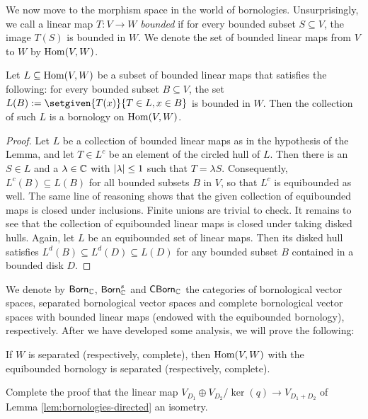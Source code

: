We now move to the morphism space in the world of bornologies. Unsurprisingly, we call a linear map \(T \colon V \to W\) \textit{bounded} if for every bounded subset \(S \subseteq V\), the image \(T(S)\) is bounded in \(W\). We denote the set of bounded linear maps from \(V\) to \(W\) by \(\operatorname{Hom}(V,W)\). 

\begin{lemma}
    Let \(L \subseteq \operatorname{Hom}(V,W)\) be a subset of bounded linear maps that satisfies the following: for every bounded subset \(B \subseteq V\), the set \(L(B) \defeq \setgiven{T(x)}{T \in L, x \in B}\) is bounded in \(W\). Then the collection of such \(L\) is a bornology on \(\operatorname{Hom}(V,W)\).
\end{lemma}
\begin{proof}
    Let \(L\) be a collection of bounded linear maps as in the hypothesis of the Lemma, and let \(T \in L^c\) be an element of the circled hull of \(L\). Then there is an \(S \in L\) and a \(\lambda \in \mathbb C\) with \(\lvert\lambda\rvert \leq 1\) such that \(T = \lambda S\). Consequently, \(L^c(B) \subseteq L(B)\) for all bounded subsets \(B\) in \(V\), so that \(L^c\) is equibounded as well.  The same line of reasoning shows that the given collection of equibounded maps is closed under inclusions. Finite unions are trivial to check. It remains to see that the collection of equibounded linear maps is closed under taking disked hulls. Again, let \(L\) be an equibounded set of linear maps. Then its disked hull satisfies \(L^d(B) \subseteq L^d(D) \subseteq L(D)\) for any bounded subset \(B\) contained in a bounded disk \(D\).  
\end{proof}


We denote by \(\mathsf{Born}_\mathbb C\), \(\mathsf{Born}_\mathbb C^s\) and \(\mathsf{CBorn}_\mathbb C\) the categories of bornological vector spaces, separated bornological vector spaces and complete bornological vector spaces with bounded linear maps (endowed with the equibounded bornology), respectively. After we have developed some analysis, we will prove the following:

\begin{lemma}
    If \(W\) is separated (respectively, complete), then \(\operatorname{Hom}(V,W)\) with the equibounded bornology is separated (respectively, complete). 
\end{lemma}


\bigskip
\exs
\bigskip
\begin{exercise} \label{ex:disk-sum-iso}
Complete the proof that 
the linear map $V_{D_1} \oplus V_{D_2} / \ker(q)
\to V_{D_1+D_2}$ of Lemma \ref{lem:bornologies-directed} an isometry.
\end{exercise}

